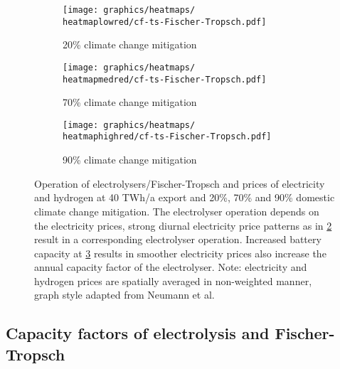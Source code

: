 \begin{figure}[h]
    \begin{subfigure}[h]{0.33\textwidth}
        \centering
        \texttt{[image: graphics/heatmaps/\\heatmaplowred/cf-ts-Fischer-Tropsch.pdf]}
        \caption{20\% climate change mitigation}
        \label{fig:operation20}
    \end{subfigure}
    \begin{subfigure}[h]{0.33\textwidth}
        \centering
        \texttt{[image: graphics/heatmaps/\\heatmapmedred/cf-ts-Fischer-Tropsch.pdf]}
        \caption{70\% climate change mitigation}
        \label{fig:operation70}
    \end{subfigure}
    \begin{subfigure}[h]{0.33\textwidth}
        \centering
        \texttt{[image: graphics/heatmaps/\\heatmaphighred/cf-ts-Fischer-Tropsch.pdf]}
        \caption{90\% climate change mitigation}
        \label{fig:operation90}
    \end{subfigure}

    \caption{Operation of electrolysers/Fischer-Tropsch and prices of electricity and hydrogen at 40 TWh/a export and 20\%, 70\% and 90\% domestic climate change mitigation. The electrolyser operation depends on the electricity prices, strong diurnal electricity price patterns as in \ref{fig:operation70} result in a corresponding electrolyser operation. Increased battery capacity at \ref{fig:operation90} results in smoother electricity prices also increase the annual capacity factor of the electrolyser. Note: electricity and hydrogen prices are spatially averaged in non-weighted manner, graph style adapted from Neumann et al. \cite{Neumann2022}}
    \label{fig:operation-ely-ft}
\end{figure}



\subsection{Capacity factors of electrolysis and Fischer-Tropsch}

